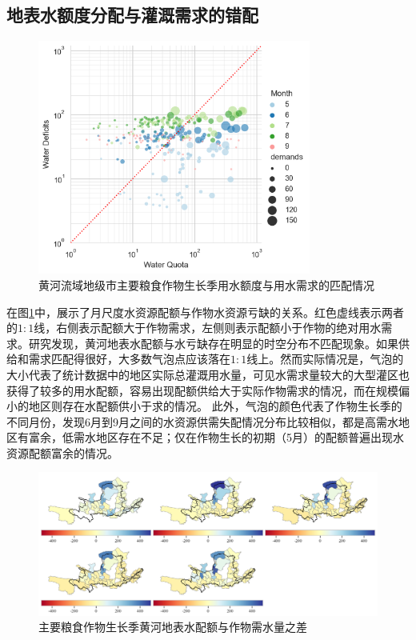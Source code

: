 
\subsection{地表水额度分配与灌溉需求的错配}

\begin{figure}[htb]
    \centering
    \includegraphics[width=0.8\textwidth]{img/ch6/ch6_matches.png}
    \caption{黄河流域地级市主要粮食作物生长季用水额度与用水需求的匹配情况}\label{ch6:fig:matches}
\end{figure}

在图\ref{ch6:fig:matches}中，展示了月尺度水资源配额与作物水资源亏缺的关系。红色虚线表示两者的$1:1$线，右侧表示配额大于作物需求，左侧则表示配额小于作物的绝对用水需求。研究发现，黄河地表水配额与水亏缺存在明显的时空分布不匹配现象。如果供给和需求匹配得很好，大多数气泡点应该落在$1:1$线上。然而实际情况是，气泡的大小代表了统计数据中的地区实际总灌溉用水量，可见水需求量较大的大型灌区也获得了较多的用水配额，容易出现配额供给大于实际作物需求的情况，而在规模偏小的地区则存在水配额供小于求的情况。
此外，气泡的颜色代表了作物生长季的不同月份，发现6月到9月之间的水资源供需失配情况分布比较相似，都是高需水地区有富余，低需水地区存在不足；仅在作物生长的初期（5月）的配额普遍出现水资源配额富余的情况。

\begin{figure}[htb]
    \centering
    \includegraphics[width=\textwidth]{img/ch6/ch6_deficits_map.png}
    \caption{主要粮食作物生长季黄河地表水配额与作物需水量之差}\label{ch6:fig:deficits_maps}
\end{figure}

